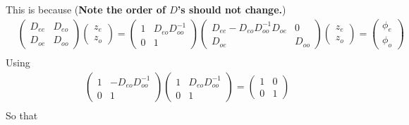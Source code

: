 This is because (\textbf{Note the order of $D$'s should not change.})
\begin{equation}
\begin{split}
&\left(\begin{array}{cc}D_{ee} & D_{eo} \\ D_{oe} & D_{oo}\end{array}\right) \left(\begin{array}{c}z_e \\ z_o \end{array}\right)
=\left(\begin{array}{cc}1 & D_{eo}D_{oo}^{-1} \\ 0 & 1\end{array}\right) \left(\begin{array}{cc}D_{ee}-D_{eo}D_{oo}^{-1}D_{oe} & 0 \\ D_{oe} & D_{oo}\end{array}\right) \left(\begin{array}{c}z_e \\ z_o \end{array}\right)=\left(\begin{array}{c}\phi _e \\ \phi_o \end{array}\right)\\
\end{split}
\end{equation}
Using 
\begin{equation}
\begin{split}
&\left(\begin{array}{cc}1 & -D_{eo}D_{oo}^{-1} \\ 0 & 1\end{array}\right)\left(\begin{array}{cc}1 & D_{eo}D_{oo}^{-1} \\ 0 & 1\end{array}\right)=\left(\begin{array}{cc}1 & 0 \\ 0 & 1\end{array}\right)\\
\end{split}
\end{equation}
So that
